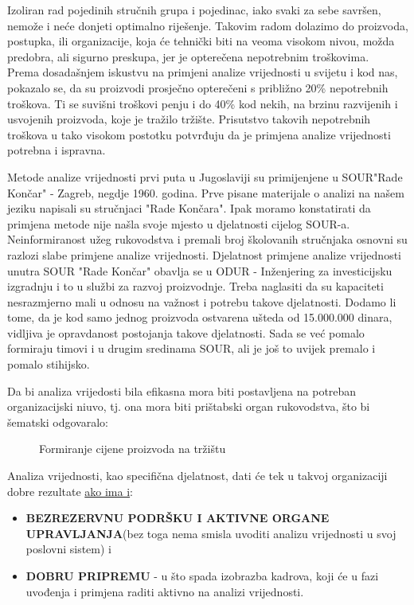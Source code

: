 \documentclass[a4paper,12pt]{article}
\numberwithin{figure}{section}
\begin{document}
Izoliran rad pojedinih stručnih grupa i pojedinac, iako svaki za sebe savršen, nemože i neće donjeti optimalno riješenje. Takovim radom dolazimo do proizvoda, postupka, ili organizacije, koja će tehnički biti na veoma visokom nivou, možda predobra, ali sigurno preskupa, jer je opterečena nepotrebnim troškovima.\\
Prema dosadašnjem iskustvu na primjeni analize vrijednosti u svijetu i kod nas, pokazalo se, da su proizvodi prosječno opterečeni s približno 20\% nepotrebnih troškova. Ti se suvišni troškovi penju i do 40\% kod nekih, na brzinu razvijenih i usvojenih proizvoda, koje je tražilo tržište. Prisutstvo takovih nepotrebnih troškova u tako visokom postotku potvrđuju da je primjena analize vrijednosti potrebna i ispravna.\par
Metode analize vrijednosti prvi puta u Jugoslaviji su primijenjene u SOUR"Rade Končar" - Zagreb, negdje 1960. godina. Prve pisane materijale o analizi na našem jeziku napisali su stručnjaci "Rade Končara". Ipak moramo konstatirati da primjena metode nije našla svoje mjesto u djelatnosti cijelog SOUR-a. Neinformiranost užeg rukovodstva i premali broj školovanih stručnjaka osnovni su razlozi slabe primjene analize vrijednosti. Djelatnost primjene analize vrijednosti unutra SOUR "Rade Končar" obavlja se u ODUR - Inženjering za investicijsku izgradnju i to u službi za razvoj proizvodnje. Treba naglasiti da su kapaciteti nesrazmjerno mali u odnosu na važnost i potrebu takove djelatnosti. Dodamo li tome, da je kod samo jednog proizvoda ostvarena ušteda od 15.000.000 dinara, vidljiva je opravdanost postojanja takove djelatnosti. Sada se već pomalo formiraju timovi i u drugim sredinama SOUR, ali je još to uvijek premalo i pomalo stihijsko. \par
Da bi analiza vrijedosti bila efikasna mora biti postavljena na potreban organizacijski niuvo, tj. ona mora biti prištabski organ rukovodstva, što bi šematski odgovaralo:
\begin{figure}
\centering
 
\caption{Formiranje cijene proizvoda na tržištu}\label{Slika1}
\end{figure}
Analiza vrijednosti, kao specifična djelatnost, dati će tek u takvoj organizaciji dobre rezultate \underline{ako ima i}:
\begin{itemize}
\item \textbf{BEZREZERVNU PODRŠKU I AKTIVNE ORGANE UPRAVLJANJA}(bez toga nema smisla uvoditi analizu vrijednosti u svoj poslovni sistem) i
\item \textbf{DOBRU PRIPREMU} - u što spada izobrazba kadrova, koji će u fazi uvođenja i primjena raditi aktivno na analizi vrijednosti.
\end{itemize}
\newpage
\end{document}
